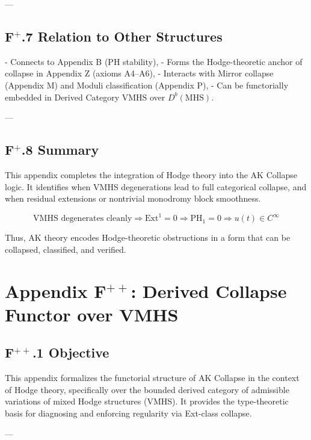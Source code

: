 \documentclass[11pt]{article}
\begin{document}
---

\subsection*{F$^+$.7 Relation to Other Structures}

- Connects to Appendix B (PH stability),
- Forms the Hodge-theoretic anchor of collapse in Appendix Z (axioms A4–A6),
- Interacts with Mirror collapse (Appendix M) and Moduli classification (Appendix P),
- Can be functorially embedded in Derived Category VMHS over \( D^b(\mathrm{MHS}) \).

---

\subsection*{F$^+$.8 Summary}

This appendix completes the integration of Hodge theory into the AK Collapse logic.  
It identifies when VMHS degenerations lead to full categorical collapse, and when residual extensions or nontrivial monodromy  
block smoothness.

\[
\boxed{
\text{VMHS degenerates cleanly} \Rightarrow \mathrm{Ext}^1 = 0 \Rightarrow \mathrm{PH}_1 = 0 \Rightarrow u(t) \in C^\infty
}
\]

Thus, AK theory encodes Hodge-theoretic obstructions in a form that can be collapsed, classified, and verified.


\section*{Appendix F$^{++}$: Derived Collapse Functor over VMHS}

\subsection*{F$^{++}$.1 Objective}

This appendix formalizes the functorial structure of AK Collapse in the context of Hodge theory,  
specifically over the bounded derived category of admissible variations of mixed Hodge structures (VMHS).  
It provides the type-theoretic basis for diagnosing and enforcing regularity via Ext-class collapse.

---
\end{document}
